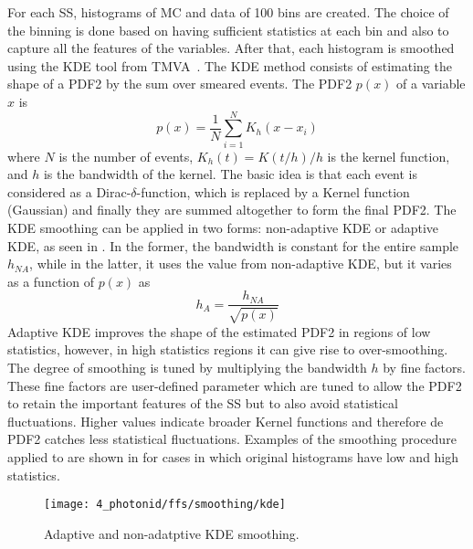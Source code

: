 For each \ac{SS}, histograms of \ac{MC} and data of 100 bins are created. The choice of the binning is done based on having sufficient statistics at each bin and also to capture all the features of the variables.
After that, each histogram is smoothed using the \acf{KDE} tool from TMVA~\cite{TMVA}. The \ac{KDE} method consists of estimating the shape of a \acf{PDF2} by the sum over smeared events. The \ac{PDF2} \(p(x)\) of a variable \(x\) is
\begin{equation}
	p(x) = \frac{1}{N}\sum_{i=1}^{N} K_h(x-x_i)
\end{equation}
where \(N\) is the number of events, \(K_h(t) = K(t/h)/h\) is the kernel function, and \(h\) is the bandwidth of the kernel. The basic idea is that each event is considered as a Dirac-\(\delta\)-function, which is replaced by a Kernel function (Gaussian) and finally they are summed altogether to form the final \ac{PDF2}. The \ac{KDE} smoothing can be applied in two forms: non-adaptive \ac{KDE} or adaptive \ac{KDE}, as seen in \Fig{\ref{fig:ss_corrections:ffs:calculation:adaptive_nonadaptive_kde}}. In the former, the bandwidth is constant for the entire sample \(h_{NA}\), while in the latter, it uses the value from non-adaptive \ac{KDE}, but it varies as a function of \(p(x)\) as
\begin{equation}
	h_A = \frac{h_{NA}}{\sqrt{p(x)}}
\end{equation}
Adaptive \ac{KDE} improves the shape of the estimated \ac{PDF2} in regions of low statistics, however, in high statistics regions it can give rise to over-smoothing. The degree of smoothing is tuned by multiplying the bandwidth \(h\) by fine factors. 
These fine factors are user-defined parameter which are tuned to allow the \ac{PDF2} to retain the important features of the \ac{SS} but to also avoid statistical fluctuations. Higher values indicate broader Kernel functions and therefore de \ac{PDF2} catches less statistical fluctuations.
Examples of the smoothing procedure applied to \rhad are shown in \Fig{\ref{fig:ss_corrections:ffs:calculation:smoothing_ss}} for cases in which original histograms have low and high statistics.

\begin{figure}[ht!]
    \centering
    \texttt{[image: 4\_photonid/ffs/smoothing/kde]}
    \caption{Adaptive and non-adatptive \ac{KDE} smoothing.}
    \label{fig:ss_corrections:ffs:calculation:adaptive_nonadaptive_kde}
\end{figure}

